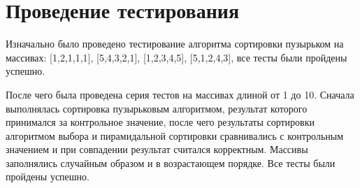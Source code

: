 \section{Проведение тестирования}
\label{sec:tests}
Изначально было проведено тестирование алгоритма сортировки пузырьком на массивах: [1,2,1,1,1], [5,4,3,2,1], [1,2,3,4,5], [5,1,2,4,3], все тесты были пройдены успешно.
\par После чего была проведена серия тестов на массивах длиной от 1 до 10. Сначала выполнялась сортировка пузырьковым алгоритмом, результат которого принимался за контрольное значение, после чего результаты сортировки алгоритмом выбора и пирамидальной сортировки сравнивались с контрольным значением и при совпадении результат считался корректным. Массивы заполнялись случайным образом и в возрастающем порядке. Все тесты были пройдены успешно.
